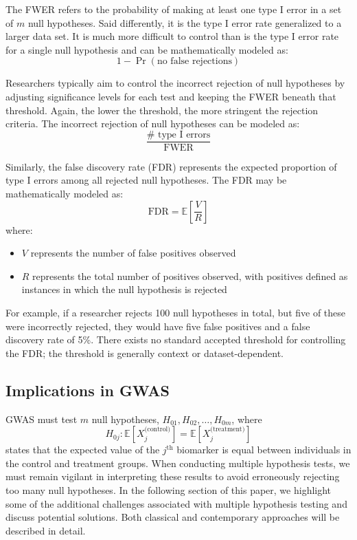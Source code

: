\documentclass[12pt]{article}
\begin{document}
The FWER refers to the probability of making at least one type I error in a set of $m$ null hypotheses. Said differently, it is the type I error rate generalized to a larger data set. It is much more difficult to control than is the type I error rate for a single null hypothesis and can be mathematically modeled as:
\[
1 - \Pr(\text{no false rejections})
\]

Researchers typically aim to control the incorrect rejection of null hypotheses by adjusting significance levels for each test and keeping the FWER beneath that threshold. Again, the lower the threshold, the more stringent the rejection criteria. The incorrect rejection of null hypotheses can be modeled as:
\[
\frac{\# \text{ type I errors}}{\text{FWER}}
\]

Similarly, the false discovery rate (FDR) represents the expected proportion of type I errors among all rejected null hypotheses. The FDR may be mathematically modeled as:
\[
\text{FDR} = \mathbb{E}\left[\frac{V}{R}\right]
\]
where:
\begin{itemize}
    \item $V$ represents the number of false positives observed
    \item $R$ represents the total number of positives observed, with positives defined as instances in which the null hypothesis is rejected
\end{itemize}

For example, if a researcher rejects 100 null hypotheses in total, but five of these were incorrectly rejected, they would have five false positives and a false discovery rate of 5\%. There exists no standard accepted threshold for controlling the FDR; the threshold is generally context or dataset-dependent.

\subsection{Implications in GWAS}
GWAS must test $m$ null hypotheses, $H_{01}, H_{02}, \ldots, H_{0m}$, where
\[
H_{0j}: \mathbb{E}[X_j^{\text{(control)}}] = \mathbb{E}[X_j^{\text{(treatment)}}]
\]
states that the expected value of the $j^{\text{th}}$ biomarker is equal between individuals in the control and treatment groups. When conducting multiple hypothesis tests, we must remain vigilant in interpreting these results to avoid erroneously rejecting too many null hypotheses. In the following section of this paper, we highlight some of the additional challenges associated with multiple hypothesis testing and discuss potential solutions. Both classical and contemporary approaches will be described in detail. \par
\end{document}
